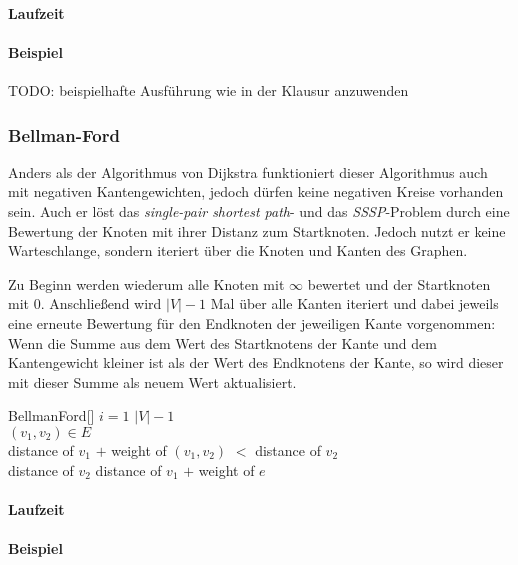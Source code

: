 \paragraph{Laufzeit}

\paragraph{Beispiel}
TODO: beispielhafte Ausführung wie in der Klausur anzuwenden

\subsubsection{Bellman-Ford}
\label{subsubsec:BellmanFord}

Anders als der Algorithmus von Dijkstra funktioniert dieser Algorithmus auch mit negativen Kantengewichten,
jedoch dürfen keine negativen Kreise vorhanden sein.
Auch er löst das \textit{single-pair shortest path}- und das \textit{SSSP}-Problem durch eine Bewertung der Knoten mit ihrer Distanz zum Startknoten.
Jedoch nutzt er keine Warteschlange, sondern iteriert über die Knoten und Kanten des Graphen.

Zu Beginn werden wiederum alle Knoten mit $\infty$ bewertet und der Startknoten mit $0$.
Anschließend wird $|V| - 1$ Mal über alle Kanten iteriert und dabei jeweils eine erneute Bewertung für den Endknoten der jeweiligen Kante vorgenommen:
Wenn die Summe aus dem Wert des Startknotens der Kante und dem Kantengewicht kleiner ist als der Wert des Endknotens der Kante, so wird dieser mit dieser Summe als neuem Wert aktualisiert.

\begin{algorithm}{BellmanFord}[]{
	\qinput{}
	\qoutput{}
}
\qfor $i = 1$ \qto $|V| - 1$\\
	\qfor $(v_1, v_2) \in E$\\
		\qif distance of $v_1$ $+$ weight of $(v_1, v_2)$ $<$ distance of $v_2$\\
			\qthen distance of $v_2$ \qlet distance of $v_1$ $+$ weight of $e$
		\qfi
	\qrof
\qrof
\end{algorithm}

\paragraph{Laufzeit}

\paragraph{Beispiel}

